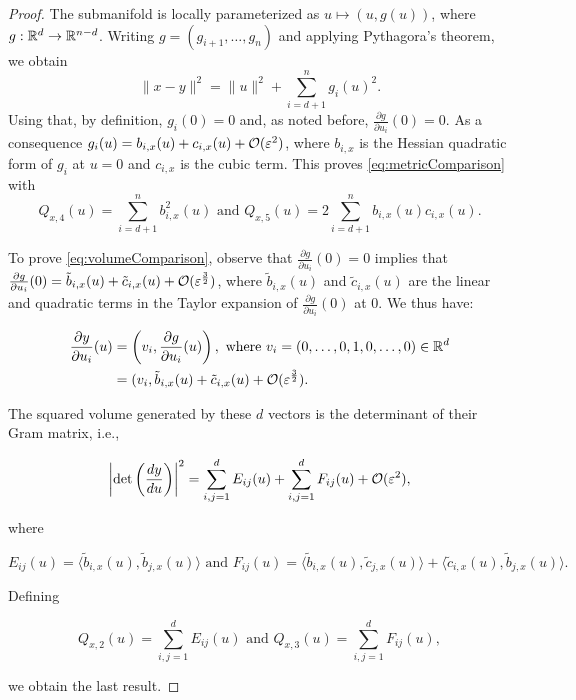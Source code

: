 \begin{proof}
The submanifold is locally parameterized as $u\mapsto(u,g(u))$, where $g:\mathbb{R}^d\rightarrow\mathbb{R}^{n-d}$. Writing $g=(g_{i+1},\dots,g_n)$ and applying Pythagora's theorem, we obtain
\begin{equation*}
\|x-y\|^2=\|u\|^2+\sum_{i=d+1}^n g_i(u)^2.
\end{equation*}
Using that, by definition, $g_i(0)=0$ and, as noted before, $\frac{\partial g}{\partial u_i}(0)=0$. As a consequence $g_i(u)=b_{i,x}(u)+c_{i,x}(u)+\mathcal{O}(\varepsilon^2)$, where $b_{i,x}$ is the Hessian quadratic form of $g_i$ at $u=0$ and $c_{i,x}$ is the cubic term. This proves \eqref{eq:metricComparison} with
\begin{equation*}
Q_{x,4}(u)=\sum_{i=d+1}^n b_{i,x}^2(u) \text{ and } Q_{x,5}(u)=2\sum_{i=d+1}^n b_{i,x}(u)c_{i,x}(u).
\end{equation*}

To prove \eqref{eq:volumeComparison}, observe that $\frac{\partial g}{\partial u_i}(0)=0$ implies that $\frac{\partial g}{\partial u_i}(0)=\tilde{b}_{i,x}(u)+\tilde{c}_{i,x}(u)+\mathcal{O}(\varepsilon^\frac{3}{2})$, where $\tilde{b}_{i,x}(u)$ and $\tilde{c}_{i,x}(u)$ are the linear and quadratic terms in the Taylor expansion of $\frac{\partial g}{\partial u_i}(0)$ at $0$. We thus have:

\begin{equation*}\begin{aligned}
\frac{\partial y}{\partial u_i}(u)&=\left(v_i,\frac{\partial g}{\partial u_i}(u)\right), \text{ where } v_i=(0,\dots,0,1,0,\dots,0)\in\mathbb{R}^d \\
&=(v_i,\tilde{b}_{i,x}(u)+\tilde{c}_{i,x}(u)+\mathcal{O}(\varepsilon^\frac{3}{2}).
\end{aligned}\end{equation*}

The squared volume generated by these $d$ vectors is the determinant of their Gram matrix, i.e.,

\begin{equation*}
\left| \det\left(\frac{dy}{du} \right)\right|^2=\sum_{i,j=1}^d E_{ij}(u)+\sum_{i,j=1}^d F_{ij}(u)+\mathcal{O}(\varepsilon^2),
\end{equation*}

where

\begin{equation*}
E_{ij}(u)=\langle \tilde{b}_{i,x}(u),\tilde{b}_{j,x}(u)\rangle \text{ and } F_{ij}(u)=\langle \tilde{b}_{i,x}(u),\tilde{c}_{j,x}(u)\rangle + \langle \tilde{c}_{i,x}(u),\tilde{b}_{j,x}(u)\rangle.
\end{equation*}

Defining

\begin{equation*}
Q_{x,2}(u)=\sum_{i,j=1}^d E_{ij}(u) \text{ and } Q_{x,3}(u)=\sum_{i,j=1}^d F_{ij}(u),
\end{equation*}

we obtain the last result.
\end{proof}


